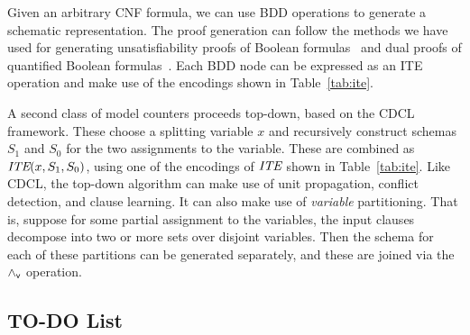 \documentclass{llncs}
\newcommand{\pand}{\mathbin{\land_{\sf v}}}
\newcommand{\obar}[1]{\overline{#1}}
\newcommand{\ite}{\mbox{\it ITE}}
\begin{document}
Given an arbitrary CNF formula, we can use BDD operations to generate
a schematic representation.  The proof generation can follow the
methods we have used for generating unsatisfiability proofs of Boolean
formulas~\cite{bryant:tacas:2021} and dual proofs of quantified
Boolean formulas~\cite{bryant:cade:2021}.
Each BDD node can be expressed as an ITE operation and
make use of the encodings shown in Table~\ref{tab:ite}.

A second class of model counters proceeds top-down, based on the CDCL
framework.  These choose a splitting variable $x$ and recursively
construct schemas $S_1$ and $S_0$ for the two assignments to the
variable.  These are combined as $\ite(x, S_1, S_0)$, using one of the
encodings of $\ite$ shown in Table~\ref{tab:ite}.  Like CDCL, the
top-down algorithm can make use of unit propagation, conflict
detection, and clause learning.  It can also make use of {\em
  variable} partitioning.  That is, suppose for some partial
assignment to the variables, the input clauses decompose into two or
more sets over disjoint variables.  Then the schema for each of these
partitions can be generated separately, and these are joined via the $\pand$
operation.



\subsection{TO-DO List}
\end{document}
